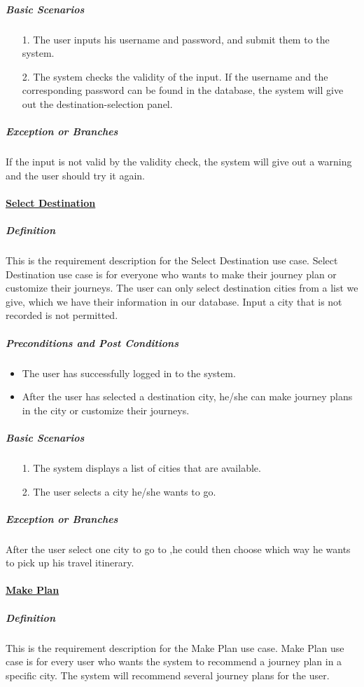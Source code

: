 \documentclass[10pt]{article}
\begin{document}
\begin{itemize}
		\subparagraph{Basic Scenarios} 
		\begin{itemize}
			\item[1.] The user inputs his username and password, and submit them to the system.
		
			\item[2.] The system checks the validity of the input. If the username and the corresponding password can be found in the database, the system will give out the destination-selection panel.
		\end{itemize}

		\subparagraph{Exception or Branches}
		If the input is not valid by the validity check, the system will give out a warning and the user should try it again.

		\paragraph{\underline{Select Destination}}
		\subparagraph{Definition} This is the requirement description for the Select Destination use case. Select Destination use case is for everyone who wants to make their journey plan or customize their journeys. The user can only select destination cities from a list we give, which we have their information in our database. Input a city that is not recorded is not permitted.

		\subparagraph{Preconditions and Post Conditions}
		\begin{itemize}
			\item The user has successfully logged in to the system.
			\item After the user has selected a destination city, he/she can make journey plans in the city or customize their journeys.
		\end{itemize}

		\subparagraph{Basic Scenarios}
		\begin{itemize}
			\item[1.] The system displays a list of cities that are available.
			\item[2.] The user selects a city he/she wants to go.
		\end{itemize}

		\subparagraph{Exception or Branches}
		After the user select one city to go to ,he could then choose which way he wants to pick up his travel itinerary.

		\paragraph{\underline{Make Plan}}
		\subparagraph{Definition}
		This is the requirement description for the Make Plan use case. Make Plan use case is for every user who wants the system to recommend a journey plan in a specific city. The system will recommend several journey plans for the user.


\end{itemize}
\end{document}
